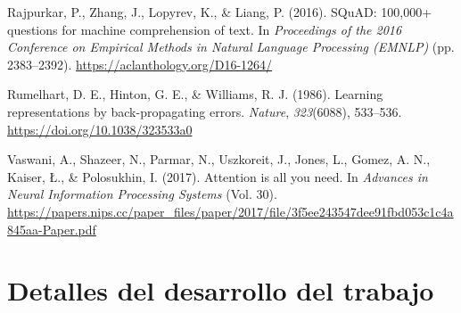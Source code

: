 \documentclass[12pt,twoside]{article}
\begin{document}
\begin{thebibliography}{100}
 Rajpurkar, P., Zhang, J., Lopyrev, K., \& Liang, P. (2016). SQuAD: 100,000+ questions for machine comprehension of text. In \textit{Proceedings of the 2016 Conference on Empirical Methods in Natural Language Processing (EMNLP)} (pp. 2383--2392). \url{https://aclanthology.org/D16-1264/}

 Rumelhart, D. E., Hinton, G. E., \& Williams, R. J. (1986). Learning representations by back-propagating errors. \textit{Nature}, \textit{323}(6088), 533--536. \url{https://doi.org/10.1038/323533a0}

 Vaswani, A., Shazeer, N., Parmar, N., Uszkoreit, J., Jones, L., Gomez, A. N., Kaiser, Ł., \& Polosukhin, I. (2017). Attention is all you need. In \textit{Advances in Neural Information Processing Systems} (Vol. 30). \url{https://papers.nips.cc/paper_files/paper/2017/file/3f5ee243547dee91fbd053c1c4a845aa-Paper.pdf}






\end{thebibliography}


\newpage
\appendix

\section{Detalles del desarrollo del trabajo}
\end{document}
